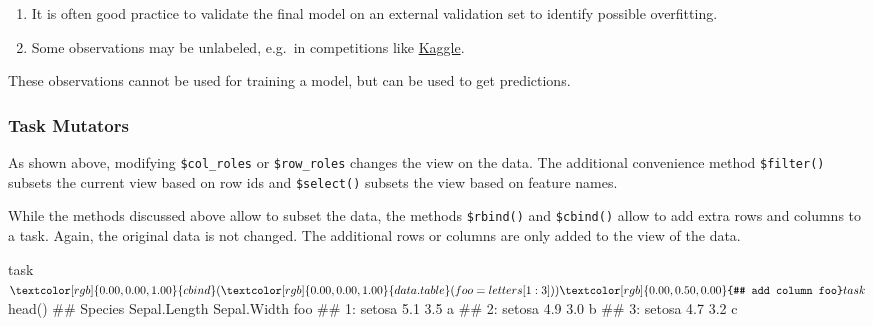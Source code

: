 \documentclass[
  11pt,
  parskip=half,
  DIV=calc,
  BCOR=10mm,
  x11names]{scrbook}
\newenvironment{Shaded}{}{}
\newcommand{\CommentTok}[1]{\textcolor[rgb]{0.00,0.50,0.00}{#1}}
\newcommand{\DataTypeTok}[1]{#1}
\newcommand{\DecValTok}[1]{#1}
\newcommand{\KeywordTok}[1]{\textcolor[rgb]{0.00,0.00,1.00}{#1}}
\newcommand{\NormalTok}[1]{#1}
\newcommand{\OperatorTok}[1]{#1}
\newcommand{\StringTok}[1]{\textcolor[rgb]{0.00,0.50,0.50}{#1}}
\providecommand{\tightlist}{%
  \setlength{\itemsep}{0pt}\setlength{\parskip}{0pt}}
\begin{document}
\begin{enumerate}
\def\labelenumi{\arabic{enumi}.}
\tightlist
\item
  It is often good practice to validate the final model on an external validation set to identify possible overfitting.
\item
  Some observations may be unlabeled, e.g.~in competitions like \href{https://www.kaggle.com/}{Kaggle}.
\end{enumerate}

These observations cannot be used for training a model, but can be used to get predictions.

\hypertarget{tasks-mutators}{%
\subsubsection{Task Mutators}\label{tasks-mutators}}

As shown above, modifying \texttt{\$col\_roles} or \texttt{\$row\_roles} changes the view on the data.
The additional convenience method \texttt{\$filter()} subsets the current view based on row ids and \texttt{\$select()} subsets the view based on feature names.

\begin{Shaded}
\end{Shaded}

While the methods discussed above allow to subset the data, the methods \texttt{\$rbind()} and \texttt{\$cbind()} allow to add extra rows and columns to a task.
Again, the original data is not changed.
The additional rows or columns are only added to the view of the data.

\begin{Shaded}
\begin{Highlighting}[]
\NormalTok{task}\OperatorTok{$}\KeywordTok{cbind}\NormalTok{(}\KeywordTok{data.table}\NormalTok{(}\DataTypeTok{foo =}\NormalTok{ letters[}\DecValTok{1}\OperatorTok{:}\DecValTok{3}\NormalTok{]))  }\CommentTok{# add column foo}
\NormalTok{task}\OperatorTok{$}\KeywordTok{head}\NormalTok{()}
\NormalTok{##    Species Sepal.Length Sepal.Width foo}
\NormalTok{## 1:  setosa          5.1         3.5   a}
\NormalTok{## 2:  setosa          4.9         3.0   b}
\NormalTok{## 3:  setosa          4.7         3.2   c}
\end{Highlighting}
\end{Shaded}
\end{document}
